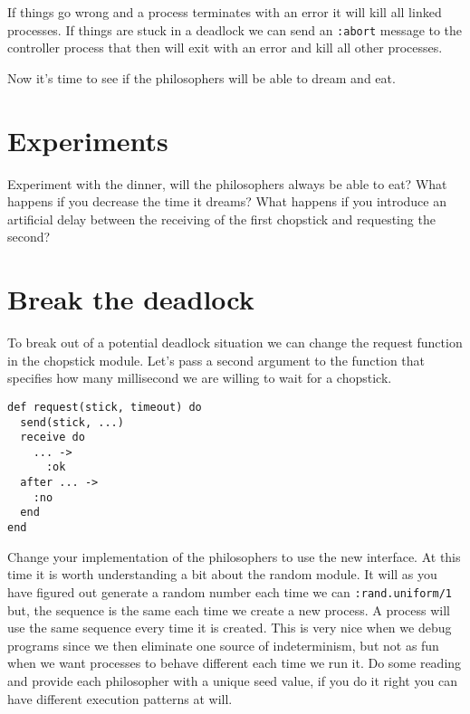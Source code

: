 \documentclass[a4paper,11pt]{article}
\begin{document}
If things go wrong and a process terminates with an error it will kill
all linked processes. If things are stuck in a deadlock we can send
an {\tt :abort} message to the controller process that then will exit
with an error and kill all other processes.

Now it's time to see if the philosophers will be able to dream and eat. 



\section{Experiments}

Experiment with the dinner, will the philosophers always be able to
eat? What happens if you decrease the time it dreams? What happens if
you introduce an artificial delay between the receiving of the first
chopstick and requesting the second?



\section{Break the deadlock}

To break out of a potential deadlock situation we can change the
request function in the chopstick module. Let's pass a second argument
to the function that specifies how many millisecond we are willing to
wait for a chopstick.

\pagebreak

\begin{verbatim}
def request(stick, timeout) do
  send(stick, ...)
  receive do
    ... -> 
      :ok
  after ... -> 
    :no
  end
end
\end{verbatim}

Change your implementation of the philosophers to use the new
interface. At this time it is worth understanding a bit about the
random module. It will as you have figured out generate a random
number each time we can {\tt :rand.uniform/1} but, the sequence is 
the same each
time we create a new process. A process will use the same sequence
every time it is created. This is very nice when we debug programs
since we then eliminate one source of indeterminism, but not as fun
when we want processes to behave different each time we run it. Do
some reading and provide each philosopher with a unique seed value, if
you do it right you can have different execution patterns at will.
\end{document}
